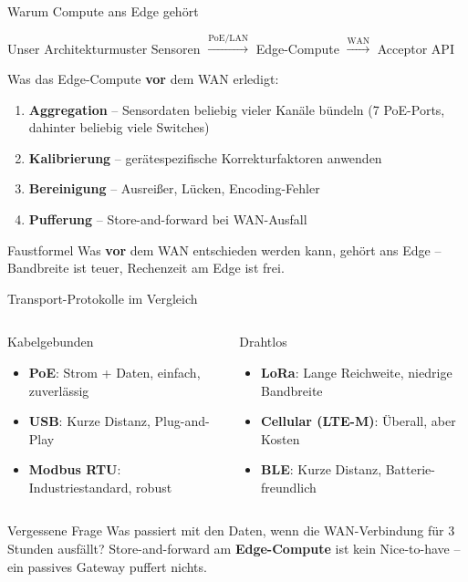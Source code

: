 \documentclass[aspectratio=169]{beamer}
\begin{document}
\begin{frame}{Warum Compute ans Edge gehört}
  \begin{block}{Unser Architekturmuster}
    Sensoren $\xrightarrow{\text{PoE/LAN}}$ Edge-Compute
    $\xrightarrow{\text{WAN}}$ Acceptor API
  \end{block}
  \vspace{0.5em}
  Was das Edge-Compute \textbf{vor} dem WAN erledigt:
  \begin{enumerate}
    \item \textbf{Aggregation} – Sensordaten beliebig vieler Kanäle bündeln
          (7 PoE-Ports, dahinter beliebig viele Switches)
    \item \textbf{Kalibrierung} – gerätespezifische Korrekturfaktoren anwenden
    \item \textbf{Bereinigung} – Ausreißer, Lücken, Encoding-Fehler
    \item \textbf{Pufferung} – Store-and-forward bei WAN-Ausfall
  \end{enumerate}
  \vspace{0.5em}
  \begin{alertblock}{Faustformel}
    Was \textbf{vor} dem WAN entschieden werden kann, gehört ans Edge –
    Bandbreite ist teuer, Rechenzeit am Edge ist frei.
  \end{alertblock}
\end{frame}

\begin{frame}{Transport-Protokolle im Vergleich}
  \begin{columns}
      \begin{block}{Kabelgebunden}
        \begin{itemize}
          \item \textbf{PoE}: Strom + Daten, einfach, zuverlässig
          \item \textbf{USB}: Kurze Distanz, Plug-and-Play
          \item \textbf{Modbus RTU}: Industriestandard, robust
        \end{itemize}
      \end{block}
      \begin{block}{Drahtlos}
        \begin{itemize}
          \item \textbf{LoRa}: Lange Reichweite, niedrige Bandbreite
          \item \textbf{Cellular (LTE-M)}: Überall, aber Kosten
          \item \textbf{BLE}: Kurze Distanz, Batterie-freundlich
        \end{itemize}
      \end{block}
  \end{columns}
  \vspace{0.5em}
  \begin{alertblock}{Vergessene Frage}
    Was passiert mit den Daten, wenn die WAN-Verbindung für 3 Stunden ausfällt?
    Store-and-forward am \textbf{Edge-Compute} ist kein Nice-to-have –
    ein passives Gateway puffert nichts.
  \end{alertblock}
\end{frame}
\end{document}
